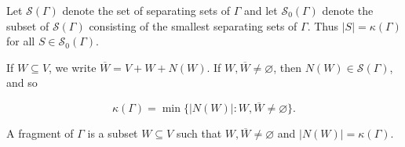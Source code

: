 Let $\mathcal{S}(\Gamma)$ denote the set of separating sets of $\Gamma$ and let $\mathcal{S}_0(\Gamma)$ denote the subset of $\mathcal{S}(\Gamma)$ consisting of the smallest separating sets of $\Gamma$. Thus $|S| = \kappa(\Gamma)$ for all $S \in \mathcal{S}_0(\Gamma)$.

If $W \subseteq V$, we write $\overline{W} = V + W + N(W)$. If $W, \overline{W} \neq \varnothing$, then $N(W) \in \mathcal{S}(\Gamma)$, and so

$$\kappa(\Gamma) = \min\{|N(W)| : W, \overline{W} \neq \varnothing\}.$$

A fragment of $\Gamma$ is a subset $W \subseteq V$ such that $W, \overline{W} \neq \varnothing$ and $|N(W)| = \kappa(\Gamma)$.
